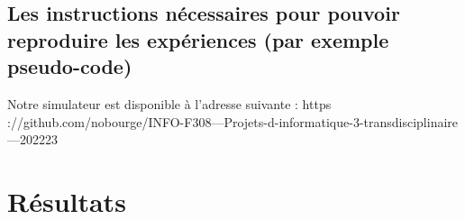 \documentclass[journal, a4paper]{IEEEtran}
\begin{document}
	\subsection{Les instructions nécessaires pour pouvoir reproduire les expériences (par exemple pseudo-code)}\label{subsec:les-instructions-necessaires-pour-pouvoir-reproduire-les-experiences-(par-exemple-pseudo-code)}
	Notre  simulateur  est  disponible  à  l’adresse  suivante  : https
	://github.com/nobourge/INFO-F308---Projets-d-informatique-3-transdisciplinaire---202223

\section{Résultats}\label{sec:resultats}
\end{document}
